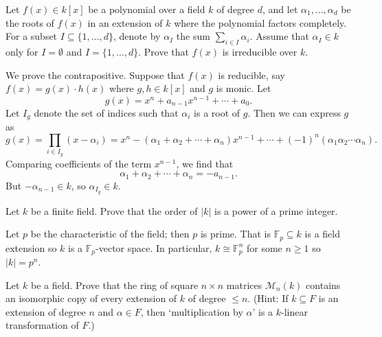 \documentclass[../../master.tex]{subfiles}
\begin{document}
\begin{problem}
    Let $f(x) \in k[x]$ be a polynomial over a field $k$ of degree $d$, and let $\alpha_1, \ldots, \alpha_d$ be the roots of $f(x)$ in an extension of $k$ where the polynomial factors completely.
    For a subset $I \subseteq \{1, \ldots, d\}$, denote by $\alpha_I$ the sum $\sum_{i \in I} \alpha_i$.
    Assume that $\alpha_I \in k$ only for $I = \emptyset$ and $I = \{1, \ldots, d\}$.
    Prove that $f(x)$ is irreducible over $k$.
\end{problem}

\begin{solution}
    We prove the contrapositive.
    Suppose that $f(x)$ is reducible, say $f(x) = g(x) \cdot h(x)$ where $g, h \in k[x]$ and $g$ is monic.
    Let
    \[
        g(x) = x^{n} + a_{n-1} x^{n-1} + \cdots + a_0.
    \]
    Let $I_g$ denote the set of indices such that $\alpha_i$ is a root of $g$.
    Then we can express $g$ as
    \[
        g(x) = \prod_{i \in I_g} (x - \alpha_i) = x^{n} - (\alpha_1 + \alpha_2 + \cdots + \alpha_n) x^{n-1} + \cdots + (-1)^{n} (\alpha_1 \alpha_2 \cdots \alpha_n).
    \]
    Comparing coefficients of the term $x^{n-1}$, we find that 
    \[
        \alpha_1 + \alpha_2 + \cdots + \alpha_n = -a_{n-1}.
    \]
    But $-\alpha_{n-1} \in k$, so $\alpha_{I_g} \in k$.
\end{solution}

\begin{problem}
    Let $k$ be a finite field.
    Prove that the order of $|k|$ is a power of a prime integer.
\end{problem}

\begin{solution}
    Let $p$ be the characteristic of the field; then $p$ is prime.
    That is $\mathbb{F}_p \subseteq k$ is a field extension so $k$ is a $\mathbb{F}_p$-vector space.
    In particular, $k \cong \mathbb{F}_p^{n}$ for some $n \geq 1$ so $|k| = p^{n}$.
\end{solution}

\begin{problem}
    Let $k$ be a field.
    Prove that the ring of square $n \times n$ matrices $\mathcal{M}_n(k)$ contains an isomorphic copy of every extension of $k$ of degree $\leq n$.
    (Hint: If $k \subseteq F$ is an extension of degree $n$ and $\alpha \in F$, then `multiplication by $\alpha$' is a $k$-linear transformation of $F$.)
\end{problem}
\end{document}
